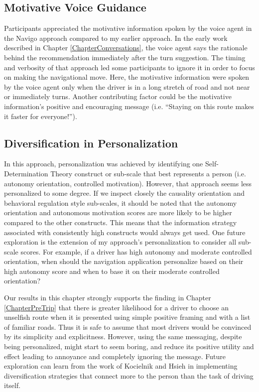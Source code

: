 \subsection{Motivative Voice Guidance}
Participants appreciated the motivative information spoken by the voice agent in the Navigo approach compared to my earlier approach. In the early work described in Chapter \ref{ChapterConversations}, the voice agent says the rationale behind the recommendation immediately after the turn suggestion. The timing and verbosity of that approach led some participants to ignore it in order to focus on making the navigational move. Here, the motivative information were spoken by the voice agent only when the driver is in a long stretch of road and not near or immediately turns. Another contributing factor could be the motivative information's positive and encouraging message (i.e. ``Staying on this route makes it faster for everyone!'').

\subsection{Diversification in Personalization}
In this approach, personalization was achieved by identifying one Self-Determination Theory construct or sub-scale that best represents a person (i.e. autonomy orientation, controlled motivation). However, that approach seems less personalized to some degree. If we inspect closely the causality orientation and behavioral regulation style sub-scales, it should be noted that the autonomy orientation and autonomous motivation scores are more likely to be higher compared to the other constructs. This means that the information strategy associated with consistently high constructs would always get used. One future exploration is the extension of my approach's personalization to consider all sub-scale scores. For example, if a driver has high autonomy and moderate controlled orientation, when should the navigation application personalize based on their high autonomy score and when to base it on their moderate controlled orientation? 

Our results in this chapter strongly supports the finding in Chapter \ref{ChapterPreTrip} that there is greater likelihood for a driver to choose an unselfish route when it is presented using simple positive framing and with a list of familiar roads. Thus it is safe to assume that most drivers would be convinced by its simplicity and explicitness. However, using the same messaging, despite being personalized, might start to seem boring, and reduce its positive utility and effect leading to annoyance and completely ignoring the message. Future exploration can learn from the work of Kocielnik and Hsieh\cite{kocielnik2017send} in implementing diversification strategies that connect more to the person than the task of driving itself. 

